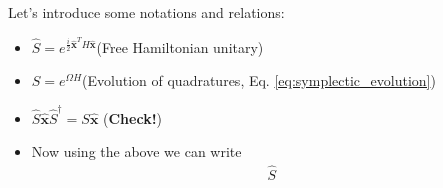 \documentclass[english,10pt,a4paper]{article}
\newcommand{\xx}{\hat{\textbf{x}}}
\begin{document}
	Let's introduce some notations and relations:
	\begin{itemize}
		\item  $\hat S = e^{\frac{i}{2} \xx^T H \xx}$\hfill (Free Hamiltonian unitary)
		\item  $S = e^{\Omega H}$\hfill(Evolution of quadratures, Eq. \ref{eq:symplectic_evolution})
		\item $\hat S \xx \hat S^\dagger = S \xx$ \hfill (\textbf{Check!})
		\item Now using the above we can write
		\begin{align}
			\hat S 
		\end{align}
	\end{itemize}
	
\end{document}
